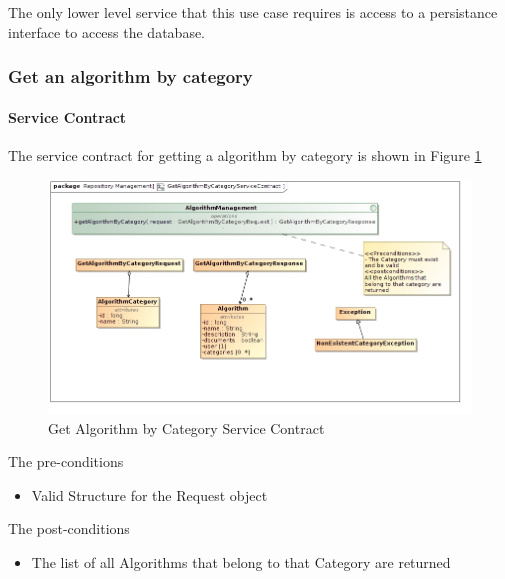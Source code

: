 The only lower level service that this use case requires is access to
a persistance interface to access the database.

\subsubsection {Get an algorithm by category}
\paragraph{Service Contract}
The service contract for getting a algorithm by category is shown in Figure \ref{fig:getAlgoByCategoryService}
\begin{figure}[H]
  \begin{center}
  \includegraphics[scale=0.6]{../Diagrams and Charts/Test Data/GetAlgorithmByCategoryServiceContract.jpg}
  \caption{Get Algorithm by Category Service Contract}
  \label{fig:getAlgoByCategoryService}
  \end{center}
  
\end{figure}

The pre-conditions
\begin{itemize}
  \item Valid Structure for the Request object
\end{itemize}

The post-conditions
\begin{itemize}
  \item The list of all Algorithms that belong to that Category are returned
\end{itemize}

